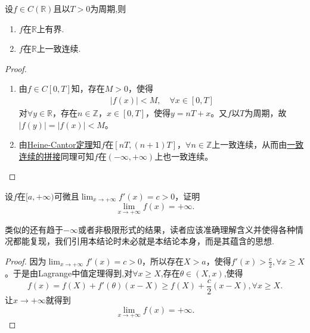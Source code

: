 \documentclass[../../main.tex]{subfiles}%
\begin{document}
\begin{proposition}[连续的周期函数的基本性质]\label{proposition:连续的周期函数的基本性质}
设$f\in C(\mathbb{R})$且以$T>0$为周期,则
\begin{enumerate}[(1)]
\item $f$在$\mathbb{R}$上有界.

\item $f$在$\mathbb{R}$上一致连续.
\end{enumerate}
\end{proposition}
\begin{proof}
\begin{enumerate}[(1)]
\item 由$f\in C\left[ 0,T \right]$知，存在$M>0$，使得
\begin{align*}
\left| f\left( x \right) \right|<M,\quad \forall x\in \left[ 0,T \right]
\end{align*}
对$\forall y\in \mathbb{R}$，存在$n\in \mathbb{Z}$，$x\in \left[ 0,T \right]$，使得$y=nT+x$。又$f$以$T$为周期，故$\left| f\left( y \right) \right|=\left| f\left( x \right) \right|<M$。

\item 由\hyperref[theroem:Heine-Cantor定理]{Heine-Cantor定理}知$f$在$\left[ nT,\left( n+1 \right) T \right]$，$\forall n\in \mathbb{Z}$上一致连续，从而由\hyperref[proposition:一致连续函数的拼接]{一致连续的拼接}同理可知$f$在$\left( -\infty ,+\infty \right)$上也一致连续。
\end{enumerate}
\end{proof}

\begin{proposition}[导数有正增长率则函数爆炸]\label{proposition:导数有正增长率则函数爆炸}
设\(f\)在\([a,+\infty)\)可微且\(\lim_{x\rightarrow +\infty}f'(x)=c > 0\)，证明
\[\lim_{x\rightarrow +\infty}f(x)=+\infty.\]
\end{proposition}
\begin{note}
类似的还有趋于\(-\infty\)或者非极限形式的结果，读者应该准确理解含义并使得各种情况都能复现，我们引用本结论时未必就是本结论本身，而是其蕴含的思想.
\end{note}
\begin{proof}
因为\(\lim_{x\rightarrow +\infty}f'(x)=c > 0\)，所以存在\(X > a\)，使得\(f'(x)>\frac{c}{2},\forall x\geqslant X\)。于是由Lagrange中值定理得到,对$\forall x\geqslant X$,存在$\theta \in (X,x)$,使得
\[f(x)=f(X)+f'(\theta)(x - X)\geqslant f(X)+\frac{c}{2}(x - X),\forall x\geqslant X.\]
让\(x\rightarrow +\infty\)就得到
\[\lim_{x\rightarrow +\infty}f(x)=+\infty.\]
\end{proof}
\end{document}
